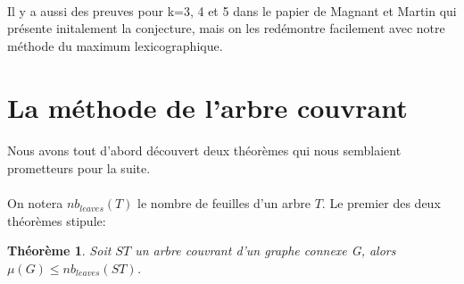 \documentclass[a4paper]{article}
\newtheorem{theorem}{Théorème}
\theoremstyle{definition}
\theoremstyle{remark}
\begin{document}
\paragraph{}
Il y a aussi des preuves pour k=3, 4 et 5 dans le papier de Magnant et
Martin qui présente initalement la conjecture, mais on les redémontre facilement avec notre méthode du maximum lexicographique.

\section{La méthode de l'arbre couvrant}

\paragraph{}
Nous avons tout d'abord découvert deux théorèmes qui nous semblaient prometteurs pour la suite.

\paragraph{}
On notera $nb_{leaves}(T)$ le nombre de feuilles d'un arbre $T$. Le premier des deux théorèmes stipule:
\begin{theorem}
Soit $ST$ un arbre couvrant d'un graphe connexe G, alors $\mu(G) \leq nb_{leaves}(ST)$.
\end{theorem}
\end{document}
